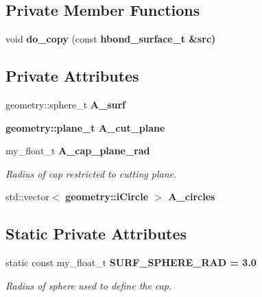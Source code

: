 \subsection*{Private Member Functions}
\begin{CompactItemize}
\item 
void \textbf{do\_\-copy} (const \bf{hbond\_\-surface\_\-t} \&src)\label{classASCbase_1_1hbond__surface__t_e9299a1f7a8dbf67c3136863dd2df237}

\end{CompactItemize}
\subsection*{Private Attributes}
\begin{CompactItemize}
\item 
geometry::sphere\_\-t \textbf{A\_\-surf}\label{classASCbase_1_1hbond__surface__t_95bfd3372bb83fadd0b1708da01dec8d}

\item 
\bf{geometry::plane\_\-t} \textbf{A\_\-cut\_\-plane}\label{classASCbase_1_1hbond__surface__t_397632033debf716dbcc7fc8ef81fb61}

\item 
my\_\-float\_\-t \bf{A\_\-cap\_\-plane\_\-rad}\label{classASCbase_1_1hbond__surface__t_83046f180c928461d3f67c4b3b81554c}

\begin{CompactList}\small\item\em Radius of cap restricted to cutting plane. \item\end{CompactList}\item 
std::vector$<$ \bf{geometry::i\-Circle} $>$ \textbf{A\_\-circles}\label{classASCbase_1_1hbond__surface__t_f0161567ebb1e37b69510969d76ddb86}

\end{CompactItemize}
\subsection*{Static Private Attributes}
\begin{CompactItemize}
\item 
static const my\_\-float\_\-t \bf{SURF\_\-SPHERE\_\-RAD} = 3.0\label{classASCbase_1_1hbond__surface__t_5779dc1ca7f6d66ef343d01ba14978b8}

\begin{CompactList}\small\item\em Radius of sphere used to define the cap. \item\end{CompactList}\end{CompactItemize}


